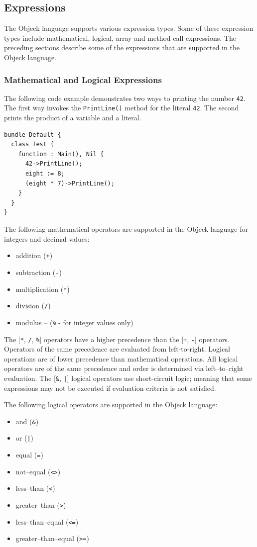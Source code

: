 \documentclass[12pt]{article}
\begin{document}
\subsection{Expressions}
The Objeck language supports various expression types.  Some of these expression types include mathematical, logical, array and method call expressions.  The preceding sections describe some of the expressions that are supported in the Objeck language.

\subsubsection{Mathematical and Logical Expressions}
The following code example demonstrates two ways to printing the number \texttt{42}.  The first way invokes the \texttt{PrintLine()} method for the literal \texttt{42}.  The second prints the product of a variable and a literal.

\begin{verbatim}
bundle Default {
  class Test {
    function : Main(), Nil {
      42->PrintLine();
      eight := 8;
      (eight * 7)->PrintLine();
    }
  }
}
\end{verbatim}

The following mathematical operators are supported in the Objeck language for integers and decimal values:
\begin{itemize}
    \item addition (\texttt{+})
    \item subtraction (\texttt{-})
    \item multiplication (\texttt{*})
    \item division (\texttt{/})
    \item modulus -- (\texttt{\%} - for integer values only)
\end{itemize}

The [\texttt{*}, \texttt{/}, \texttt{\%}] operators have a higher precedence than  the [\texttt{+}, \texttt{-}] operators. Operators of the same precedence are evaluated from left-to-right.  Logical operations are of lower precedence than mathematical operations. All logical operators are of the same precedence and order is determined via left--to--right evaluation.  The [\texttt{\&}, \texttt{|}] logical operators use short-circuit logic; meaning that some expressions may not be executed if evaluation criteria is not satisfied.

The following logical operators are supported in the Objeck language:
\begin{itemize}
    \item and (\texttt{\&})
    \item or (\texttt{|})
    \item equal (\texttt{=})
    \item not--equal (\texttt{<>})
    \item less--than (\texttt{<})
    \item greater--than (\texttt{>})
    \item less--than--equal (\texttt{<=})
    \item greater--than--equal (\texttt{>=})
\end{itemize}
\end{document}
